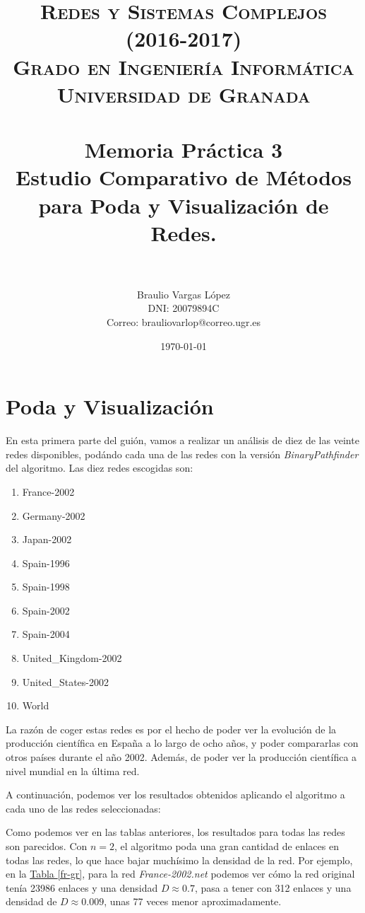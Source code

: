 \documentclass[paper=a4, fontsize=11pt]{article} %
\title{ 
\normalfont \normalsize 
\textsc{{\bf Redes y Sistemas Complejos (2016-2017)} \\ Grado en Ingeniería Informática \\ Universidad de Granada} \\ [25pt] %
\horrule{0.5pt} \\[0.4cm] %
\huge Memoria Práctica 3\\ Estudio Comparativo de Métodos para Poda y Visualización de Redes.\\%
\horrule{2pt} \\[0.5cm] %
}
\author{Braulio Vargas López\\DNI: 20079894C\\Correo: brauliovarlop@correo.ugr.es} %
\date{\normalsize\today} %
\numberwithin{equation}{section} %
\numberwithin{figure}{section} %
\numberwithin{table}{section} %
\begin{document}
\maketitle %
\newpage %

\tableofcontents %
{}

\section{Poda y Visualización}

En esta primera parte del guión, vamos a realizar un análisis de diez de las veinte redes disponibles, podándo cada una de las redes con la versión \textit{BinaryPathfinder} del algoritmo. Las diez redes escogidas son:

\begin{enumerate}
    \item France-2002
    \item Germany-2002
    \item Japan-2002
    \item Spain-1996
    \item Spain-1998
    \item Spain-2002
    \item Spain-2004
    \item United\_Kingdom-2002
    \item United\_States-2002
    \item World
\end{enumerate}

La razón de coger estas redes es por el hecho de poder ver la evolución de la producción científica en España a lo largo de ocho años, y poder compararlas con otros países durante el año 2002. Además, de poder ver la producción científica a nivel mundial en la última red.

A continuación, podemos ver los resultados obtenidos aplicando el algoritmo a cada uno de las redes seleccionadas:

  

Como podemos ver en las tablas anteriores, los resultados para todas las redes son parecidos. Con $n=2$, el algoritmo poda una gran cantidad de enlaces en todas las redes, lo que hace bajar muchísimo la densidad de la red. Por ejemplo, en la \hyperref[fr-gr]{Tabla \ref*{fr-gr}}, para la red \textit{France-2002.net} podemos ver cómo la red original tenía 23986 enlaces y una densidad $D\approx 0.7$, pasa a tener con 312 enlaces y una densidad de $D \approx 0.009$, unas 77 veces menor aproximadamente.
\end{document}
